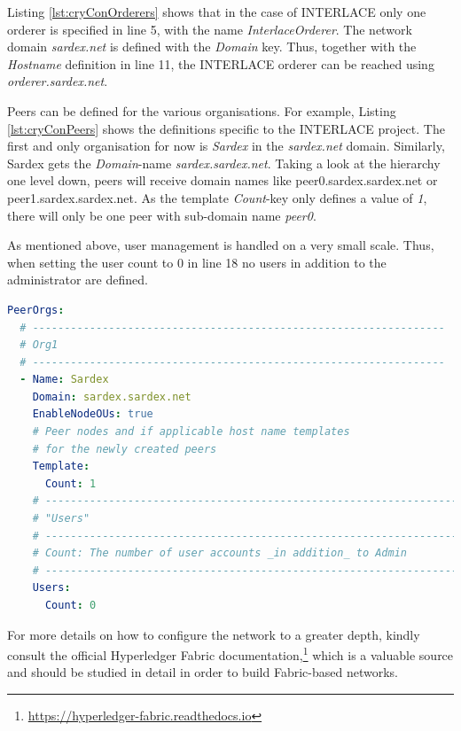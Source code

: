 Listing \ref{lst:cryConOrderers} shows that in the case of INTERLACE only one orderer is specified in line 5, with the name \textit{InterlaceOrderer}. The network domain \textit{sardex.net} is defined with the \textit{Domain} key. Thus, together with the \textit{Hostname} definition in line 11, the INTERLACE orderer can be reached using \textit{orderer.sardex.net}.

Peers can be defined for the various organisations. For example, Listing \ref{lst:cryConPeers} shows the definitions specific to the INTERLACE project. The first and only organisation for now is \textit{Sardex} in the \textit{sardex.net} domain. Similarly, Sardex gets the \textit{Domain}-name \textit{sardex.sardex.net}. Taking a look at the hierarchy one level down, peers will receive domain names like peer0.sardex.sardex.net or peer1.sardex.sardex.net. As the template \textit{Count}-key only defines a value of \textit{1}, there will only be one peer with sub-domain name \textit{peer0}.

As mentioned above, user management is handled on a very small scale. Thus, when setting the user count to 0 in line 18 no users in addition to the administrator are defined.

\begin{center}
\begin{minipage}{0.8\textwidth}
\small
\begin{lstlisting}[language=yaml,firstnumber=1,caption={\bf\small crypto-config.yaml excerpt - Peer(s) definition}, captionpos=b,label=lst:cryConPeers]
PeerOrgs:
  # -----------------------------------------------------------------
  # Org1
  # -----------------------------------------------------------------
  - Name: Sardex
    Domain: sardex.sardex.net
    EnableNodeOUs: true
    # Peer nodes and if applicable host name templates
    # for the newly created peers
    Template:
      Count: 1
    # -----------------------------------------------------------------
    # "Users"
    # -----------------------------------------------------------------
    # Count: The number of user accounts _in addition_ to Admin
    # -----------------------------------------------------------------
    Users:
      Count: 0
\end{lstlisting}
\end{minipage}
\end{center}

For more details on how to configure the network to a greater depth, kindly consult the official Hyperledger Fabric documentation,\footnote{\url{https://hyperledger-fabric.readthedocs.io}} which is a valuable source and should be studied in detail in order to build Fabric-based networks.

